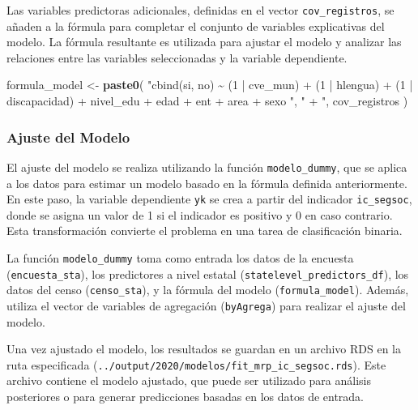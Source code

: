 \documentclass[
  12pt,
]{book}
\newenvironment{Shaded}{\begin{snugshade}}{\end{snugshade}}
\newcommand{\FunctionTok}[1]{\textcolor[rgb]{0.13,0.29,0.53}{\textbf{#1}}}
\newcommand{\NormalTok}[1]{#1}
\newcommand{\OtherTok}[1]{\textcolor[rgb]{0.56,0.35,0.01}{#1}}
\newcommand{\StringTok}[1]{\textcolor[rgb]{0.31,0.60,0.02}{#1}}
\begin{document}
Las variables predictoras adicionales, definidas en el vector \texttt{cov\_registros}, se añaden a la fórmula para completar el conjunto de variables explicativas del modelo. La fórmula resultante es utilizada para ajustar el modelo y analizar las relaciones entre las variables seleccionadas y la variable dependiente.

\begin{Shaded}
\begin{Highlighting}[]
\NormalTok{formula\_model }\OtherTok{\textless{}{-}}
  \FunctionTok{paste0}\NormalTok{(}
    \StringTok{"cbind(si, no) \textasciitilde{} (1 | cve\_mun) + (1 | hlengua) + (1 | discapacidad) +  nivel\_edu + edad  + ent + area + sexo "}\NormalTok{,}
    \StringTok{" + "}\NormalTok{,}
\NormalTok{    cov\_registros}
\NormalTok{  )}
\end{Highlighting}
\end{Shaded}

\hypertarget{ajuste-del-modelo-2}{%
\subsubsection*{Ajuste del Modelo}\label{ajuste-del-modelo-2}}

El ajuste del modelo se realiza utilizando la función \texttt{modelo\_dummy}, que se aplica a los datos para estimar un modelo basado en la fórmula definida anteriormente. En este paso, la variable dependiente \texttt{yk} se crea a partir del indicador \texttt{ic\_segsoc}, donde se asigna un valor de 1 si el indicador es positivo y 0 en caso contrario. Esta transformación convierte el problema en una tarea de clasificación binaria.

La función \texttt{modelo\_dummy} toma como entrada los datos de la encuesta (\texttt{encuesta\_sta}), los predictores a nivel estatal (\texttt{statelevel\_predictors\_df}), los datos del censo (\texttt{censo\_sta}), y la fórmula del modelo (\texttt{formula\_model}). Además, utiliza el vector de variables de agregación (\texttt{byAgrega}) para realizar el ajuste del modelo.

Una vez ajustado el modelo, los resultados se guardan en un archivo RDS en la ruta especificada (\texttt{../output/2020/modelos/fit\_mrp\_ic\_segsoc.rds}). Este archivo contiene el modelo ajustado, que puede ser utilizado para análisis posteriores o para generar predicciones basadas en los datos de entrada.
\end{document}
